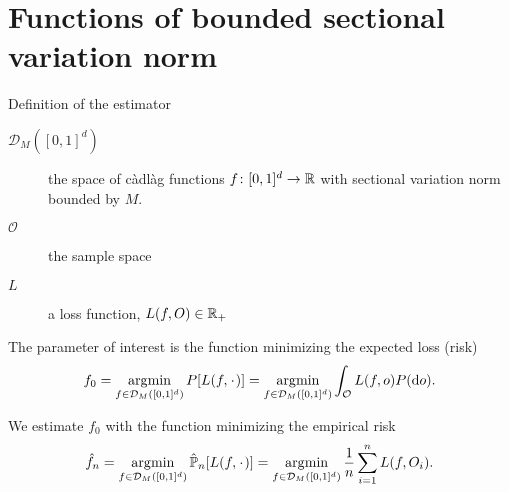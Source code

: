 \documentclass[smaller]{beamer}\usepackage{listings}
\begin{document}
\section{Functions of bounded sectional variation norm}
\label{sec:orga7c3652}
\begin{frame}[label={sec:org12fba9a}]{Definition of the estimator}
\small

\begin{description}
\item[{\(\mathcal{D}_M([0,1]^d)\)}] the space of \color{blue}càdlàg \color{black}
functions \(f \colon [0,1]^d \rightarrow \mathbb{R}\) with \color{blue}sectional
variation norm \color{black} bounded by \(M\).
\item[{\(\mathcal{O}\)}] the sample space
\item[{\(L\)}] a loss function, \(L(f, O) \in \mathbb{R}_+\)
\end{description}

\vfill 

The parameter of interest is the function minimizing the expected loss (risk)
\begin{equation*}
  f_0 = \argmin_{f\in \mathcal{D}_M([0,1]^d)} P[L(f, \blank)]
  = \argmin_{f\in \mathcal{D}_M([0,1]^d)} \int_{\mathcal{O}} L(f, o)  P (\diff o).
\end{equation*}

\vfill 

We estimate \(f_0\) with the function minimizing the empirical risk
\begin{equation*}
  \hat{f}_n
  = \argmin_{f\in \mathcal{D}_M([0,1]^d)} \empmeas[L(f, \blank)]
  = \argmin_{f\in \mathcal{D}_M([0,1]^d)} \frac{1}{n}\sum_{i=1}^{n}L(f,O_i).
\end{equation*}
\end{frame}
\end{document}
